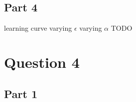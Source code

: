 \documentclass{article}
\begin{document}
    \subsection{Part 4}\label{subsec:question-3-4}
    learning curve
    varying $\epsilon$
    varying $\alpha$
    TODO


    \section{Question 4}\label{sec:question-4}

    \subsection{Part 1}\label{subsec:question-4-1}
\end{document}
